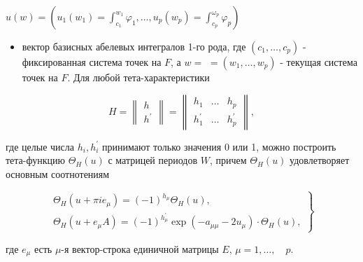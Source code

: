 \documentclass[10pt]{article}
\begin{document}
$u(w)=\left(u_{1}\left(w_{1}\right)=\int_{c_{1}}^{w_{1}} \varphi_{1}, \ldots, u_{p}\left(w_{p}\right)=\int_{c_{p}}^{\omega_{p}} \varphi_{p}\right)$



\begin{itemize}

  \item вектор базисных абелевых интегралов 1-го рода, где $\left(c_{1}, \ldots, c_{p}\right)$ - фиксированная система точек на $F$, а $w=$ $=\left(w_{1}, \ldots, w_{p}\right)$ - текущая система точек на $F$. Для любой тета-характеристики

\end{itemize}



\[

H=\left\|\begin{array}{l}

h \\

h^{\prime}

\end{array}\right\|=\left\|\begin{array}{lll}

h_{1} & \ldots & h_{p} \\

h_{1}^{\prime} & \ldots & h_{p}^{\prime}

\end{array}\right\|,

\]



где целые числа $h_{i}, h_{i}^{\prime}$ принимают только значения 0 или 1, можно построить тета-функцию $\Theta_{H}(u)$ с матрицей периодов $W$, причем $\Theta_{H}(u)$ удовлетворяет основным соотнотениям



\[

\left.\begin{array}{c}

\Theta_{H}\left(u+\pi i e_{\mu}\right)=(-1)^{h_{\mu}} \Theta_{H}(u), \\

\Theta_{H}\left(u+e_{\mu} A\right)=(-1)^{h_{\mu}^{\prime}} \exp \left(-a_{\mu \mu}-2 u_{\mu}\right) \cdot \Theta_{H}(u),

\end{array}\right\}

\]



где $e_{\mu}$ есть $\mu$-я вектор-строка единичной матрицы $E$, $\mu=1, \ldots, \quad p$.
\end{document}
